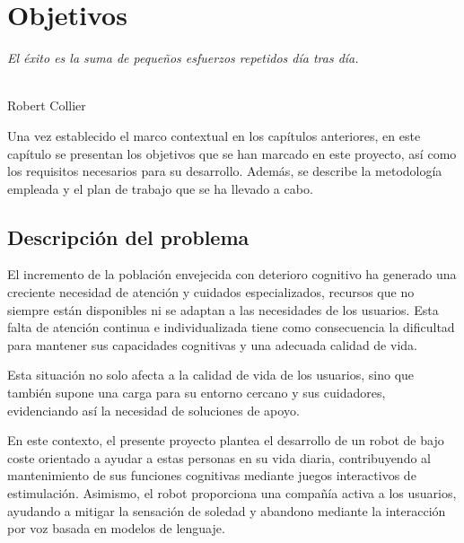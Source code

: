 \chapter{Objetivos}
\label{cap:capitulo3}

\begin{flushright}
\begin{minipage}[]{10cm}
\emph{El éxito es la suma de pequeños esfuerzos repetidos día tras día.}\\
\end{minipage}\\

Robert Collier\\
\end{flushright}

\vspace{1cm}

Una vez establecido el marco contextual en los capítulos anteriores, en este capítulo se presentan los objetivos que se han marcado en este proyecto, así como los requisitos necesarios para su desarrollo.
Además, se describe la metodología empleada y el plan de trabajo que se ha llevado a cabo.\\

\section{Descripción del problema}
\label{sec:descripcion}
El incremento de la población envejecida con deterioro cognitivo ha generado una creciente necesidad de atención y cuidados especializados, recursos que no siempre están disponibles ni se adaptan a las necesidades de los usuarios. Esta falta de atención continua e individualizada tiene como consecuencia la dificultad para mantener sus capacidades cognitivas y una adecuada calidad de vida.

Esta situación no solo afecta a la calidad de vida de los usuarios, sino que también supone una carga para su entorno cercano y sus cuidadores, evidenciando así la necesidad de soluciones de apoyo.

\vspace{0.2cm}

En este contexto, el presente proyecto plantea el desarrollo de un robot de bajo coste orientado a ayudar a estas personas en su vida diaria, contribuyendo al mantenimiento de sus funciones cognitivas mediante juegos interactivos de estimulación. Asimismo, el robot proporciona una compañía activa a los usuarios, ayudando a mitigar la sensación de soledad y abandono mediante la interacción por voz basada en modelos de lenguaje.

